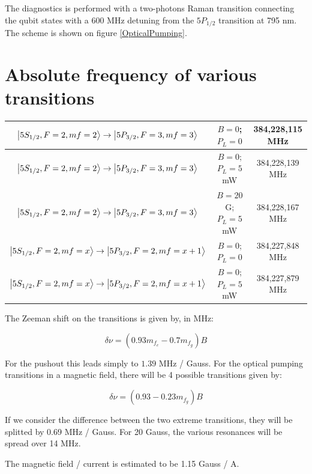 \documentclass[
10pt, %
a4paper, %
oneside, %
headinclude,footinclude, %
BCOR5mm, %
]{scrartcl}
\begin{document}
The diagnostics is performed with a two-photons Raman transition connecting the qubit states with a 600 MHz detuning from the $5P_{1/2}$ transition at 795 nm. The scheme is shown on figure \ref{OpticalPumping}.

\clearpage
\newpage
\section{Absolute frequency of various transitions}

\begin{center}
 \begin{tabular}{||c c c||} 
 \hline
 $\ket{5S_{1/2}, F=2, mf=2} \rightarrow \ket{5P_{3/2}, F=3, mf=3}$ & $B=0$; $P_{L}=0$ &  384,228,115 MHz  \\ 
 \hline
 $\ket{5S_{1/2}, F=2, mf=2} \rightarrow \ket{5P_{3/2}, F=3, mf=3}$ & $B=0$; $P_{L}=5$ mW &  384,228,139 MHz \\ 
 \hline
  $\ket{5S_{1/2}, F=2, mf=2} \rightarrow \ket{5P_{3/2}, F=3, mf=3}$ & $B=20$ G; $P_{L}=5$ mW &  384,228,167 MHz \\ 
  \hline
   $\ket{5S_{1/2}, F=2, mf=x} \rightarrow \ket{5P_{3/2}, F=2, mf=x+1}$ & $B=0$; $P_{L}=0$ &  384,227,848 MHz  \\ 
 \hline
 $\ket{5S_{1/2}, F=2, mf=x} \rightarrow \ket{5P_{3/2}, F=2, mf=x+1}$ & $B=0$; $P_{L}=5$ mW &  384,227,879 MHz \\ [1ex]
 \hline
\end{tabular}
\end{center}

The Zeeman shift on the transitions is given by, in MHz:

\begin{equation}
	\delta \nu = (0.93 m_{f_{e}} - 0.7 m_{f_{g}} ) B
\end{equation}

For the pushout this leads simply to $1.39$ MHz / Gauss. For the optical pumping transitions in a magnetic field, there will be 4 possible transitions given by:

\begin{equation}
 	\delta \nu = (0.93 - 0.23 m_{f_{g}} ) B
 \end{equation} 

If we consider the difference between the two extreme transitions, they will be splitted by 0.69 MHz / Gauss. For 20 Gauss, the various resonances will be spread over 14 MHz.


The magnetic field / current is estimated to be 1.15 Gauss / A.
\end{document}
